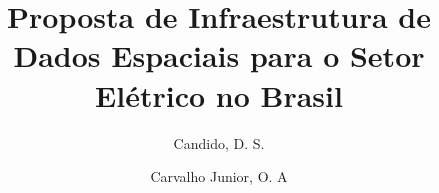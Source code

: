 \documentclass[preprint,authoryear,11pt]{elsarticle}
\begin{document}
\begin{frontmatter}



\title{Proposta de Infraestrutura de Dados Espaciais para o Setor Elétrico no Brasil}

\author{Candido, D. S.}

\author{Carvalho Junior, O. A}

\address{Universidade de Brasília, Instituto de Ciências Humanas, Departamento de Geografia, Brasília, DF - Brasil}




\begin{abstract}

\end{abstract}

\begin{keyword}


\end{keyword}

\end{frontmatter}

\end{document}
